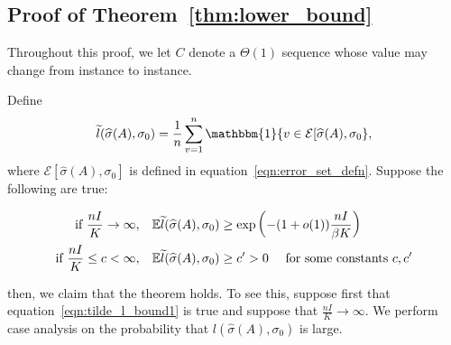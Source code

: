 \documentclass{article}
\begin{document}
\subsection*{Proof of Theorem~\ref{thm:lower_bound}}
\label{sec:actual_lower_bound_proof}
Throughout this proof, we let $C$ denote a $\Theta(1)$ sequence whose value may change from instance to instance. 


Define
\[
\tilde{l}(\hat{\sigma}(A), \sigma_0) = \frac{1}{n} 
     \sum_{v=1}^n \mathbbm{1}\{ v \in \mathcal{E}[\hat{\sigma}(A), \sigma_0 \},
\]
where $\mathcal{E}[\hat{\sigma}(A), \sigma_0]$ is defined in equation~\ref{eqn:error_set_defn}. Suppose the following are true:

\begin{align}
\textrm{if $\frac{nI}{K} \rightarrow \infty$}, & \quad 
       {\mathbb E} \widetilde{l}(\widehat{\sigma}(A), \sigma_0) \geq \exp \left( - (1+o(1)) \frac{nI}{\beta K} \right) 
    \label{eqn:tilde_l_bound1} \\
\textrm{if $\frac{nI}{K} \leq c < \infty$}, &\quad 
       {\mathbb E} \widetilde{l}(\widehat{\sigma}(A), \sigma_0) \geq c' > 0 \quad \textrm{ for some constants $c, c'$}
    \label{eqn:tilde_l_bound2}
\end{align}

then, we claim that the theorem holds. To see this, suppose first that equation~\ref{eqn:tilde_l_bound1} is true and suppose that $\frac{nI}{K} \rightarrow \infty$. We perform case analysis on the probability that $l(\hat{\sigma}(A), \sigma_0)$ is large.
\end{document}
